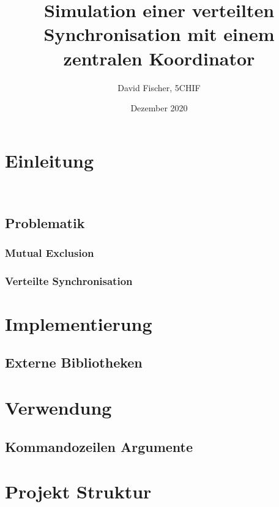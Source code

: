 \documentclass[12pt, letterpaper]{article}
\title{Simulation einer verteilten Synchronisation mit einem zentralen Koordinator}
\author{David Fischer, 5CHIF}
\date{Dezember 2020}
\begin{document}
\begin{titlepage}
\maketitle
\end{titlepage}

\tableofcontents
\newpage

\section{Einleitung}

~\cite{temp}

\subsection{Problematik}

\subsubsection{Mutual Exclusion}

\subsubsection{Verteilte Synchronisation}

\section{Implementierung}

\subsection{Externe Bibliotheken}

\section{Verwendung}

\subsection{Kommandozeilen Argumente}

\section{Projekt Struktur}


\newpage


\end{document}
